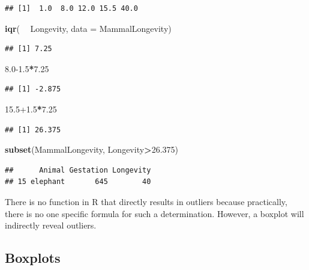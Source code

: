 \documentclass[]{book}
\newenvironment{Shaded}{\begin{snugshade}}{\end{snugshade}}
\newcommand{\DataTypeTok}[1]{\textcolor[rgb]{0.13,0.29,0.53}{#1}}
\newcommand{\FloatTok}[1]{\textcolor[rgb]{0.00,0.00,0.81}{#1}}
\newcommand{\KeywordTok}[1]{\textcolor[rgb]{0.13,0.29,0.53}{\textbf{#1}}}
\newcommand{\NormalTok}[1]{#1}
\newcommand{\OperatorTok}[1]{\textcolor[rgb]{0.81,0.36,0.00}{\textbf{#1}}}
\newcommand{\StringTok}[1]{\textcolor[rgb]{0.31,0.60,0.02}{#1}}
\begin{document}
\begin{verbatim}
## [1]  1.0  8.0 12.0 15.5 40.0
\end{verbatim}

\begin{Shaded}
\begin{Highlighting}[]
\KeywordTok{iqr}\NormalTok{( }\OperatorTok{~}\StringTok{ }\NormalTok{Longevity, }\DataTypeTok{data =}\NormalTok{ MammalLongevity)}
\end{Highlighting}
\end{Shaded}

\begin{verbatim}
## [1] 7.25
\end{verbatim}

\begin{Shaded}
\begin{Highlighting}[]
\FloatTok{8.0-1.5}\OperatorTok{*}\FloatTok{7.25}
\end{Highlighting}
\end{Shaded}

\begin{verbatim}
## [1] -2.875
\end{verbatim}

\begin{Shaded}
\begin{Highlighting}[]
\FloatTok{15.5+1.5}\OperatorTok{*}\FloatTok{7.25}
\end{Highlighting}
\end{Shaded}

\begin{verbatim}
## [1] 26.375
\end{verbatim}

\begin{Shaded}
\begin{Highlighting}[]
\KeywordTok{subset}\NormalTok{(MammalLongevity, Longevity}\OperatorTok{>}\FloatTok{26.375}\NormalTok{)}
\end{Highlighting}
\end{Shaded}

\begin{verbatim}
##      Animal Gestation Longevity
## 15 elephant       645        40
\end{verbatim}

There is no function in R that directly results in outliers because practically, there is no one specific formula for such a determination. However, a boxplot will indirectly reveal outliers.

\hypertarget{boxplots}{%
\subsection{Boxplots}\label{boxplots}}
\end{document}
